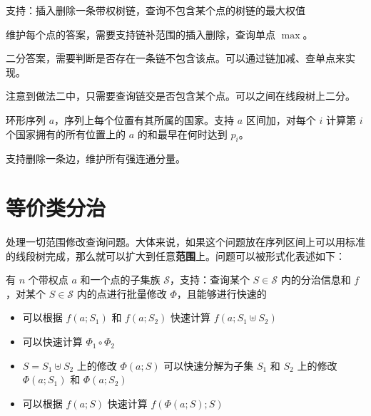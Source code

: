 \begin{example}[P4602]
    支持：插入删除一条带权树链，查询不包含某个点的树链的最大权值
\end{example}
\begin{solution}[做法一]
    维护每个点的答案，需要支持链补范围的插入删除，查询单点 $\max$。
\end{solution}
\begin{solution}[做法二]
    二分答案，需要判断是否存在一条链不包含该点。可以通过链加减、查单点来实现。
\end{solution}
\begin{solution}[做法三]
    注意到做法二中，只需要查询链交是否包含某个点。可以之间在线段树上二分。
\end{solution}

\begin{example}[P3527]
    环形序列 $a$，序列上每个位置有其所属的国家。支持 $a$ 区间加，对每个 $i$ 计算第 $i$ 个国家拥有的所有位置上的 $a$ 的和最早在何时达到 $p_i$。
\end{example}

\begin{example}[P5163]
   支持删除一条边，维护所有强连通分量。
\end{example}

\section{等价类分治}

处理一切范围修改查询问题。大体来说，如果这个问题放在序列区间上可以用标准的线段树完成，那么就可以扩大到任意\textbf{范围}上。问题可以被形式化表述如下：

\begin{definition}[范围修改查询]
    有 $n$ 个带权点 $a$ 和一个点的子集族 $\mathcal S$，支持：查询某个 $S\in \mathcal S$ 内的分治信息和 $f$，对某个 $S\in\mathcal S$ 内的点进行批量修改 $\Phi$，且能够进行快速的
    \begin{itemize}
        \item[信息合并] 可以根据 $f(a;S_1)$ 和 $f(a;S_2)$ 快速计算 $f(a;S_1\uplus S_2)$
        \item[修改合并] 可以快速计算 $\Phi_1\circ \Phi_2$
        \item[修改分裂] $S=S_1\uplus S_2$ 上的修改 $\Phi(a;S)$ 可以快速分解为子集 $S_1$ 和 $S_2$ 上的修改 $\Phi(a;S_1)$ 和 $\Phi(a;S_2)$ 
        \item[应用修改] 可以根据 $f(a;S)$ 快速计算 $f(\Phi(a;S);S)$  
    \end{itemize}
\end{definition}

